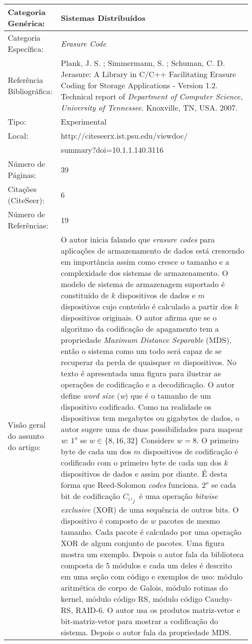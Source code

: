 \documentclass[10pt,a4paper]{article}
\begin{document}
\begin{center}
\begin{tabular}{|p{5cm}||p{10cm}|}
\hline

Categoria Genérica: & Sistemas Distribuídos\\\hline
Categoria Específica: & \emph{Erasure Code}\\\hline
Referência Bibliográfica: & Plank, J. S. ; Simmermann, S. ; Schuman, C. D. Jerasure: A Library in C/C++ Facilitating Erasure Coding for Storage Applications - Version 1.2.  Technical report of \emph{Department of Computer Science, University of Tennessee}. Knoxville, TN, USA. 2007.\\\hline
Tipo: & Experimental\\\hline
Local: & http://citeseerx.ist.psu.edu/viewdoc/\\ &summary?doi=10.1.1.140.3116\\\hline
Número de Páginas: & 39\\\hline
Citações (CiteSeer): & 6\\\hline
Número de Referências: & 19\\\hline
Visão geral do assunto do artigo: & O autor inicia falando que \emph{erasure codes} para aplicações de armazenamento de dados está crescendo em importância assim como cresce o tamanho e a complexidade dos sistemas de armazenamento. O modelo de sistema de armazenagem suportado é constituído de  $k$ dispositivos de dados e $m$ dispositivos cujo conteúdo é calculado a partir dos  $k$ dispositivos originais. O autor afirma que se o algoritmo da codificação de apagamento tem a propriedade \emph{Maximum Distance Separable} (MDS), então o sistema como um todo será capaz de se recuperar da perda de quaisquer $m$ dispositivos. No texto é apresentada uma figura para ilustrar as operações de codificação e a decodificação. O autor define \emph{word size} (\emph{w}) que é o tamanho de um dispositivo codificado. Como na realidade os dispositivos tem megabytes ou gigabytes de dados, o autor sugere uma de duas possibilidades para mapear \emph{w}: $1^o$ se $w \in \{ 8, 16, 32 \}$ Considere $w = 8$. O primeiro byte de cada um dos $m$ dispositivos de codificação é codificado com o primeiro byte de cada um dos $k$ dispositivos de dados e assim por diante. É desta forma que Reed-Solomon \emph{codes} funciona. $2^o$ se cada bit de codificação $C_i,_j$ é uma operação \emph{bitwise exclusive} (XOR) de uma sequência de outros bits. O dispositivo é composto de $w$ pacotes de mesmo tamanho. Cada pacote é calculado por uma operação XOR de algum conjunto de pacotes. Uma figura mostra um exemplo. Depois o autor fala da biblioteca composta de 5 módulos e cada um deles é descrito em uma seção com código e exemplos de uso: módulo aritmética de corpo de Galois, módulo rotinas do kernel, módulo código RS, módulo código Cauchy-RS, RAID-6. O autor usa os produtos matriz-vetor e bit-matriz-vetor para mostrar a codificação do sistema. Depois o autor fala da propriedade MDS.\\\hline

\end{tabular}
\end{center}
\end{document}

